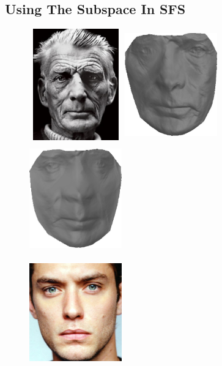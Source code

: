 \subsection{Using The Subspace In SFS}\label{subsec:experiments_smith}
\begin{figure}
    \centering
    \includegraphics[width=4cm,height=4.8cm]{collection_ps/images/smith/samuel_beckett}                    \hspace{0.3cm}
    \includegraphics[width=4cm,height=4.8cm]{collection_ps/images/smith/beckett_smith_frontal_ict}         \hspace{0.3cm}
    \includegraphics[width=4cm,height=4.8cm]{collection_ps/images/smith/beckett_smith_frontal_low_rank}    \\
    \includegraphics[width=4cm,height=4.8cm]{collection_ps/images/smith/jude_law}                          \hspace{0.3cm}

\end{figure}
